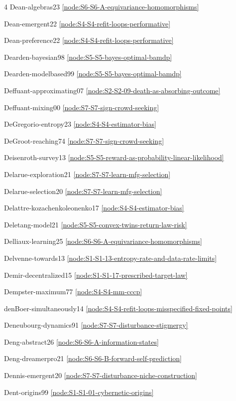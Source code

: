 \documentclass[10pt]{article}
\begin{document}
{\begin{multicols}{4}
Dean-algebras23 \hfill \ref{node:S6-S6-A-equivariance-homomorphisms}\par
Dean-emergent22 \hfill \ref{node:S4-S4-refit-loops-performative}\par
Dean-preference22 \hfill \ref{node:S4-S4-refit-loops-performative}\par
Dearden-bayesian98 \hfill \ref{node:S5-S5-bayes-optimal-bamdp}\par
Dearden-modelbased99 \hfill \ref{node:S5-S5-bayes-optimal-bamdp}\par
Deffuant-approximating07 \hfill \ref{node:S2-S2-09-death-as-absorbing-outcome}\par
Deffuant-mixing00 \hfill \ref{node:S7-S7-sign-crowd-seeking}\par
DeGregorio-entropy23 \hfill \ref{node:S4-S4-estimator-bias}\par
DeGroot-reaching74 \hfill \ref{node:S7-S7-sign-crowd-seeking}\par
Deisenroth-survey13 \hfill \ref{node:S5-S5-reward-as-probability-linear-likelihood}\par
Delarue-exploration21 \hfill \ref{node:S7-S7-learn-mfg-selection}\par
Delarue-selection20 \hfill \ref{node:S7-S7-learn-mfg-selection}\par
Delattre-kozachenkoleonenko17 \hfill \ref{node:S4-S4-estimator-bias}\par
Deletang-model21 \hfill \ref{node:S5-S5-convex-twins-return-law-risk}\par
Delliaux-learning25 \hfill \ref{node:S6-S6-A-equivariance-homomorphisms}\par
Delvenne-towards13 \hfill \ref{node:S1-S1-13-entropy-rate-and-data-rate-limits}\par
Demir-decentralized15 \hfill \ref{node:S1-S1-17-prescribed-target-law}\par
Dempster-maximum77 \hfill \ref{node:S4-S4-mm-cccp}\par
denBoer-simultaneously14 \hfill \ref{node:S4-S4-refit-loops-misspecified-fixed-points}\par
Deneubourg-dynamics91 \hfill \ref{node:S7-S7-disturbance-stigmergy}\par
Deng-abstract26 \hfill \ref{node:S6-S6-A-information-states}\par
Deng-dreamerpro21 \hfill \ref{node:S6-S6-B-forward-self-prediction}\par
Dennis-emergent20 \hfill \ref{node:S7-S7-disturbance-niche-construction}\par
Dent-origins99 \hfill \ref{node:S1-S1-01-cybernetic-origins}\par

\end{multicols}}
\end{document}
